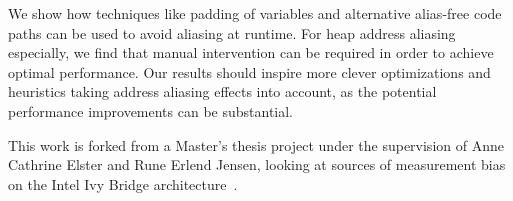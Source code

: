 \documentclass[prodmode,acmtaco]{acmsmall}
\begin{document}
We show how techniques like padding of variables and alternative alias-free code paths can be used to avoid aliasing at runtime.
For heap address aliasing especially, we find that manual intervention can be required in order to achieve optimal performance.
Our results should inspire more clever optimizations and heuristics taking address aliasing effects into account, as the potential performance improvements can be substantial.

\begin{acks}
This work is forked from a Master's thesis project under the supervision of Anne Cathrine Elster and Rune Erlend Jensen, looking at sources of measurement bias on the Intel Ivy Bridge architecture~\cite{MasterThesis}.
\end{acks}




\received{}{}{}
\end{document}
